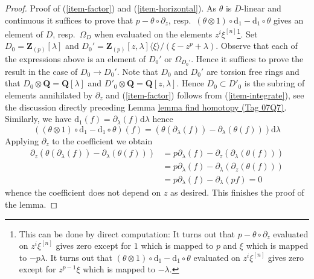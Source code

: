 \documentclass{amsart}
\theoremstyle{plain}
\theoremstyle{definition}
\theoremstyle{remark}
\numberwithin{equation}{subsection}
\begin{document}
\begin{proof}
\medskip\noindent
Proof of (\ref{item-factor}) and (\ref{item-horizontal}).
As $\theta$ is $D$-linear and continuous it suffices to prove that
$p - \theta \circ \partial_z$,
resp.\ $(\theta \otimes 1) \circ \text{d}_1 - \text{d}_1 \circ \theta$
gives an element of $D$, resp.\ $\Omega_D$ when evaluated on the
elements $z^i\xi^{[n]}$\footnote{This can be done by direct computation:
It turns out that $p - \theta \circ \partial_z$ evaluated on
$z^i\xi^{[n]}$ gives zero except for $1$ which is mapped to $p$ and
$\xi$ which is mapped to $-p\lambda$. It turns out that 
$(\theta \otimes 1) \circ \text{d}_1 - \text{d}_1 \circ \theta$
evaluated on $z^i\xi^{[n]}$ gives zero except for $z^{p - 1}\xi$
which is mapped to $-\lambda$.}.
Set $D_0 = \mathbf{Z}_{(p)}[\lambda]$ and
$D_0' = \mathbf{Z}_{(p)}[z, \lambda]\langle \xi \rangle/(\xi - z^p + \lambda)$.
Observe that each of the expressions above is an element of
$D_0'$ or $\Omega_{D_0'}$. Hence it suffices to prove the result
in the case of $D_0 \to D_0'$. Note that $D_0$ and $D_0'$
are torsion free rings and that $D_0 \otimes \mathbf{Q} = \mathbf{Q}[\lambda]$
and $D'_0 \otimes \mathbf{Q} = \mathbf{Q}[z, \lambda]$.
Hence $D_0 \subset D'_0$ is the subring of elements annihilated
by $\partial_z$ and (\ref{item-factor})
follows from (\ref{item-integrate}), see the discussion directly preceding
Lemma \href{https://stacks.math.columbia.edu/tag/07Q7}{lemma find homotopy (Tag 07Q7)}. Similarly, we have
$\text{d}_1(f) = \partial_\lambda(f)\text{d}\lambda$ hence
$$
\left((\theta \otimes 1) \circ \text{d}_1 - \text{d}_1 \circ \theta\right)(f)
=
\left(\theta(\partial_\lambda(f)) - \partial_\lambda(\theta(f))\right)
\text{d}\lambda
$$
Applying $\partial_z$ to the coefficient we obtain
\begin{align*}
\partial_z\left(
\theta(\partial_\lambda(f)) - \partial_\lambda(\theta(f))
\right)
& =
p \partial_\lambda(f) - \partial_z(\partial_\lambda(\theta(f))) \\
& =
p \partial_\lambda(f) - \partial_\lambda(\partial_z(\theta(f))) \\
& =
p \partial_\lambda(f) - \partial_\lambda(p f) = 0
\end{align*}
whence the coefficient does not depend on $z$ as desired.
This finishes the proof of the lemma.
\end{proof}
\end{document}
